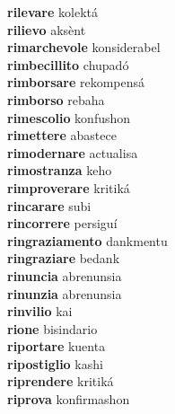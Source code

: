 \textbf{rilevare } kolektá \\
\textbf{rilievo } aksènt \\
\textbf{rimarchevole } konsiderabel \\
\textbf{rimbecillito } chupadó \\
\textbf{rimborsare } rekompensá \\
\textbf{rimborso } rebaha \\
\textbf{rimescolio } konfushon \\
\textbf{rimettere } abastece \\
\textbf{rimodernare } actualisa \\
\textbf{rimostranza } keho \\
\textbf{rimproverare } kritiká \\
\textbf{rincarare } subi \\
\textbf{rincorrere } persiguí \\
\textbf{ringraziamento } dankmentu \\
\textbf{ringraziare } bedank \\
\textbf{rinuncia } abrenunsia \\
\textbf{rinunzia } abrenunsia \\
\textbf{rinvilio } kai \\
\textbf{rione } bisindario \\
\textbf{riportare } kuenta \\
\textbf{ripostiglio } kashi \\
\textbf{riprendere } kritiká \\
\textbf{riprova } konfirmashon \\
